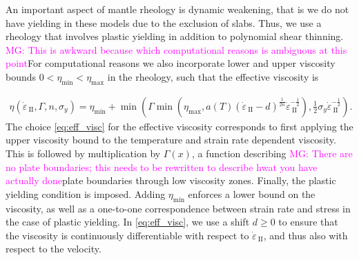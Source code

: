 \documentclass[12pt]{article}
\newcommand{\mgnote}[1]{\textcolor{magenta}{MG: #1}}
\newcommand{\IIinv}{{\dot\varepsilon}_{\mathrm{\!\!\:II}}}
\begin{document}


An important aspect of mantle rheology is dynamic weakening, that is we do not have yielding in these models due to the exclusion of slabs.
Thus, 
we use a rheology that involves
plastic yielding in addition to polynomial shear thinning. 
\mgnote{This is awkward because which computational reasons is ambiguous at this point}For
computational reasons we also
incorporate lower and upper viscosity bounds
$0 < \eta_{\min} < \eta_{\max}$ in the rheology, such that the effective viscosity is


\begin{multline}
  \label{eq:eff_visc}
  \eta(\IIinv,\Gamma, n, \sigma_{y})=\eta_{\min}+\min(\Gamma\min(\eta_{\max}, a(T)(\IIinv-d)^{\frac{1}{2n}}\IIinv^{-\frac{1}{2}}),\frac{1}{2}\sigma_y\IIinv^{-\frac{1}{2}}).
\end{multline}
 The choice
\eqref{eq:eff_visc} for the effective viscosity corresponds to first
applying the upper viscosity bound to the temperature and strain rate
dependent viscosity. This is followed by multiplication by
$\Gamma(x)$, a function describing \mgnote{There are no plate boundaries; this needs to be rewritten to describe hwat you have actually done}plate boundaries through low viscosity
zones. Finally, the plastic yielding condition is imposed. Adding
$\eta_{\min}$ enforces a lower bound on the viscosity, as well as a
one-to-one correspondence between strain rate and stress in the case
of plastic yielding.
In \eqref{eq:eff_visc}, we use a shift $d\ge 0$ to ensure 
that the viscosity is continuously differentiable with
respect to $\IIinv$, and thus also with
respect to the velocity.  
\end{document}
